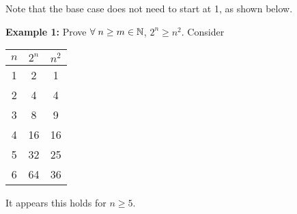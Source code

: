 \documentclass{article}
\begin{document}
\begin{remark}
  Note that the base case does not need to start at 1, as shown below.
\end{remark}
\begin{examples}
  \textbf{Example 1:}\newline
  Prove $\forall \; n \geq m \in \mathbb{N}$, $2^n \geq n^2$.
  Consider
  \begin{center}
    \begin{tabular}{ |c|c|c| }
      \hline
      $n$ & $2^n$ & $n^2$ \\
      \hline
      1 & 2 & 1 \\
      2 & 4 & 4 \\
      3 & 8 & 9 \\
      4 & 16 & 16 \\
      5 & 32 & 25 \\
      6 & 64 & 36 \\
      \hline
    \end{tabular}
  \end{center}
  It appears this holds for $n \geq 5$.


\end{examples}
\end{document}
